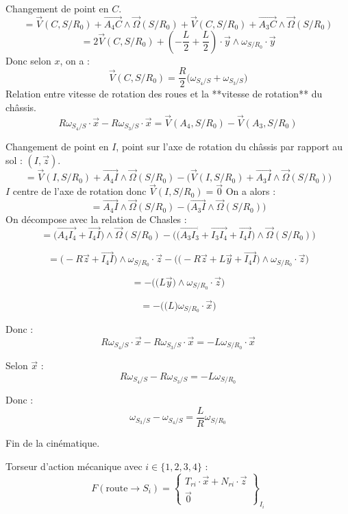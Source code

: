 \documentclass[a4paper,12pt]{report}  %
\begin{document}
Changement de point en $C$. 
$$ = 
\vec{V}(C,S/R_0) 
+ \overrightarrow{A_{4}C} \wedge \vec{\Omega}(S/R_0) 
+ \vec{V}(C,S/R_0) 
+ \overrightarrow{A_{3}C} \wedge \vec{\Omega}(S/R_0) 
$$
$$
= 2\vec{V}(C,S/R_0) + (-\frac{L}{2} + \frac{L}{2}) \cdot \vec{y} \wedge \omega_{S/R_0} \cdot \vec{y}
$$
Donc selon $x$, on a : 
$$
\boxed{
	\vec{V}(C,S/R_0) = \frac{R}{2}\bigg( \omega_{S_4/S} + \omega_{S_3/S} \bigg)
}
$$
Relation entre vitesse de rotation des roues et la **vitesse de rotation** du châssis. 
\begin{equation}
	R\omega_{S_4/S} \cdot \vec{x} - R\omega_{S_3/S} \cdot \vec{x}
	=
	\vec{V}(A_4, S/R_0) - \vec{V}(A_3, S/R_0) 
	\tag{1)–(2}
\end{equation}

Changement de point en $I$, point sur l'axe de rotation du châssis par rapport au sol : $(I,\vec{z})$. 
$$= 
\vec{V}(I, S/R_0) + \overrightarrow{A_4 I} \wedge \vec{\Omega}(S/R_0) 
- \bigg(\vec{V}(I, S/R_0) + \overrightarrow{A_3 I} \wedge \vec{\Omega}(S/R_0) \bigg)
$$
$I$ centre de l'axe de rotation donc $\vec{V}(I, S/R_0) = \vec0$
On a alors : 
$$
= \overrightarrow{A_4 I} \wedge \vec{\Omega}(S/R_0) 
- \bigg( \overrightarrow{A_3 I} \wedge \vec{\Omega}(S/R_0) \bigg)$$
On décompose avec la relation de Chasles : 
$$
= 
\bigg(\overrightarrow{A_4 I_4}+\overrightarrow{I_4 I} \bigg)
\wedge \vec{\Omega}(S/R_0) 
- 
\Bigg( 
\bigg(
\overrightarrow{A_3 I_3} 
+ \overrightarrow{I_3 I_4} 
+ \overrightarrow{I_4 I}
\bigg) 
\wedge \vec{\Omega}(S/R_0) 
\Bigg)
$$

$$
= 
\bigg( -R\vec{z}+\overrightarrow{I_4 I} \bigg)
\wedge {\omega}_{S/R_0} \cdot \vec{z} 
- 
\Bigg( 
\bigg( 
-R\vec{z} + L\vec{y} +\overrightarrow{I_4I}
\bigg) 
\wedge {\omega}_{S/R_0} \cdot \vec{z}  
\Bigg)
$$

$$
= 
- 
\Bigg( 
\bigg( 
L\vec{y} 
\bigg) 
\wedge {\omega}_{S/R_0} \cdot \vec{z}  
\Bigg)
$$

$$
= 
- 
\Bigg( 
\bigg( 
L
\bigg) 
{\omega}_{S/R_0}
\cdot \vec{x}
\Bigg)
$$

Donc : 
$$
R\omega_{S_4/S} \cdot \vec{x} - R\omega_{S_3/S} \cdot \vec{x}
=
-L {\omega}_{S/R_0} \cdot \vec{x}
$$

Selon $\vec{x}$ : 
$$
R\omega_{S_4/S} - R\omega_{S_3/S} 
=
-L {\omega}_{S/R_0} 
$$

Donc : 
$$
\boxed{
	\omega_{S_3/S} - \omega_{S_4/S} 
	=
	\frac{L}{R} {\omega}_{S/R_0}
}
$$

Fin de la cinématique. 

Torseur d'action mécanique avec $i \in \{1,2,3,4\}$ : 
$$
F(\text{route} \to S_i) = 
\begin{Bmatrix}
	T_{ri} \cdot \vec{x} + N_{ri} \cdot \vec{z} 
	\\
	\vec0
\end{Bmatrix}_{I_{i}}
$$
\end{document}
